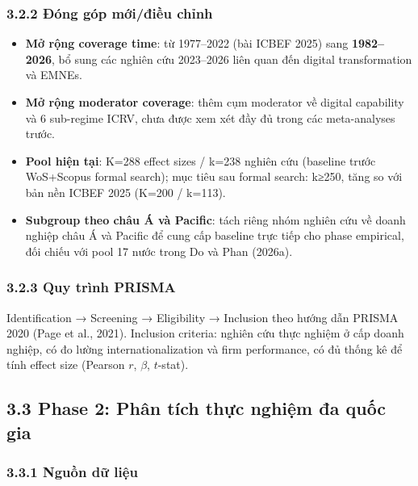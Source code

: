 \documentclass[12pt,a4paper]{article}
\providecommand{\tightlist}{\setlength{\itemsep}{0pt}\setlength{\parskip}{0pt}}
\begin{document}
\hypertarget{322-ux111uxf3ng-guxf3p-mux1edbiux111iux1ec1u-chux1ec9nh}{%
\subsubsection{3.2.2 Đóng góp mới/điều
chỉnh}\label{322-ux111uxf3ng-guxf3p-mux1edbiux111iux1ec1u-chux1ec9nh}}

\begin{itemize}
\tightlist
\item
  \textbf{Mở rộng coverage time}: từ 1977--2022 (bài ICBEF 2025) sang
  \textbf{1982--2026}, bổ sung các nghiên cứu 2023--2026 liên quan đến
  digital transformation và EMNEs.
\item
  \textbf{Mở rộng moderator coverage}: thêm cụm moderator về digital
  capability và 6 sub-regime ICRV, chưa được xem xét đầy đủ trong các
  meta-analyses trước.
\item
  \textbf{Pool hiện tại}: K=288 effect sizes / k=238 nghiên cứu
  (baseline trước WoS+Scopus formal search); mục tiêu sau formal search:
  k≥250, tăng so với bản nền ICBEF 2025 (K=200 / k=113).
\item
  \textbf{Subgroup theo châu Á và Pacific}: tách riêng nhóm nghiên cứu
  về doanh nghiệp châu Á và Pacific để cung cấp baseline trực tiếp cho
  phase empirical, đối chiếu với pool 17 nước trong Do và Phan (2026a).
\end{itemize}

\hypertarget{323-quy-truxecnh-prisma}{%
\subsubsection{3.2.3 Quy trình PRISMA}\label{323-quy-truxecnh-prisma}}

Identification → Screening → Eligibility → Inclusion theo hướng dẫn
PRISMA 2020 (Page et al., 2021). Inclusion criteria: nghiên cứu thực
nghiệm ở cấp doanh nghiệp, có đo lường internationalization và firm
performance, có đủ thống kê để tính effect size (Pearson \(r\),
\(\beta\), \(t\)-stat).

\hypertarget{33-phase-2-phuxe2n-tuxedch-thux1ef1c-nghiux1ec7m-ux111a-quux1ed1c-gia}{%
\subsection{3.3 Phase 2: Phân tích thực nghiệm đa quốc
gia}\label{33-phase-2-phuxe2n-tuxedch-thux1ef1c-nghiux1ec7m-ux111a-quux1ed1c-gia}}

\hypertarget{331-nguux1ed3n-dux1eef-liux1ec7u}{%
\subsubsection{3.3.1 Nguồn dữ
liệu}\label{331-nguux1ed3n-dux1eef-liux1ec7u}}
\end{document}
